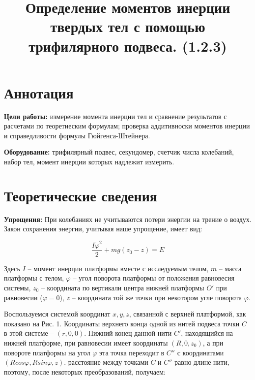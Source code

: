 \documentclass[a4paper,12pt]{article}
\title{\textbf{Определение моментов инерции твердых тел с помощью трифилярного подвеса. (1.2.3)}}
\begin{document}
\maketitle

\section{Аннотация}
    \textbf{Цели работы:} измерение момента инерции тел и сравнение результатов с расчетами по теоретиеским формулам; проверка аддитивноски моментов инерции и справедливости формулы Гюйгенса-Штейнера. \par
	\textbf{Оборудование:} трифилярный подвес, секундомер, счетчик числа колебаний, набор тел, момент инерции которых надлежит измерить. \par

\section{Теоретические сведения}
    \textbf{Упрощения:} При колебаниях не учитываются потери энергии на трение о воздух. \\
    Закон сохранения энергии, учитывая наше упрощение, имеет вид:

    
    $$\frac{I\dot \varphi^2}{2} + mg(z_0-z) = E$$
    

    Здесь $I$ -- момент инерции платформы вместе с исследуемым телом, $m$ -- масса платформы с телом, $\varphi$ -- угол поворота платформы от положения равновесия системы, $z_0$ -- координата по вертикали центра нижней платформы $O'$  при равновесии ($\varphi = 0$), $z$ -- координата той же точки при некотором угле поворота $\varphi$. \par
    Воспользуемся системой координат $x, y, z$, связанной с верхней платформой, как показано на Рис. 1. Координаты верхнего конца одной из нитей подвеса точки $C$ в этой системе -- $(r, 0, 0)$. Нижний конец данной нити $C'$, находящийся на нижней платформе, при равновесии имеет координаты $(R, 0, z_0)$, а при повороте платформы на угол $\varphi$ эта точка переходит в $C''$ с координатами $(Rcos\varphi, Rsin\varphi, z)$. расстояние между точками $C$ и $C''$ равно длине нити, поэтому, после некоторых преобразований, получаем:
    
\end{document}
